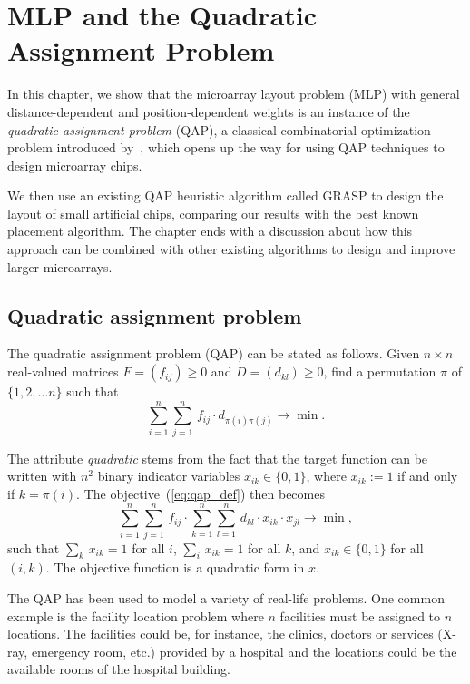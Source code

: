 \chapter{MLP and the Quadratic Assignment Problem}
\label{ch:qap}

In this chapter, we show that the microarray layout problem (MLP) with
general distance-dependent and position-dependent weights is an instance of the
\emph{quadratic assignment problem} (QAP), a classical combinatorial
optimization problem introduced by~\citet{Koopmans1957}, which opens up the way
for using QAP techniques to design microarray chips.

We then use an existing QAP heuristic algorithm called GRASP to design the
layout of small artificial chips, comparing our results with the best known
placement algorithm. The chapter ends with a discussion about how this approach
can be combined with other existing algorithms to design and improve larger
microarrays.

\section{Quadratic assignment problem}
\label{sec:qap_qap}

The quadratic assignment problem (QAP) can be stated as follows. Given
$n \times n$ real-valued matrices $F = (f_{ij})\geq 0$ and $D = (d_{kl})\geq 0$,
find a permutation $\pi$ of $\{1, 2, \ldots n\}$ such that
\begin{equation}\label{eq:qap_def}
  \sum_{i=1}^{n} \sum_{j=1}^{n}\,  f_{ij} \cdot d_{\pi(i)\pi(j)} \to \min.
\end{equation}

The attribute \emph{quadratic} stems from the fact that the target function can
be written with $n^2$ binary indicator variables $x_{ik}\in\{0,1\}$, where
$x_{ik}:=1$ if and only if $k=\pi(i)$. The objective~(\ref{eq:qap_def}) then
becomes
\[
  \sum_{i=1}^{n} \sum_{j=1}^{n}\,  f_{ij} \cdot 
  \sum_{k=1}^{n} \sum_{l=1}^{n}\,  d_{kl} \cdot x_{ik}\cdot x_{jl}
  \to \min,
\]
such that $\sum_{k}\, x_{ik}=1$ for all $i$, $\sum_{i}\, x_{ik}=1$ for all $k$,
and $x_{ik}\in\{0,1\}$ for all $(i,k)$. The objective function is a quadratic
form in $x$.

The QAP has been used to model a variety of real-life problems. One common
example is the facility location problem where $n$ facilities must be assigned
to $n$ locations. The facilities could be, for instance, the clinics, doctors or
services (X-ray, emergency room, etc.) provided by a hospital and the locations
could be the available rooms of the hospital building.

